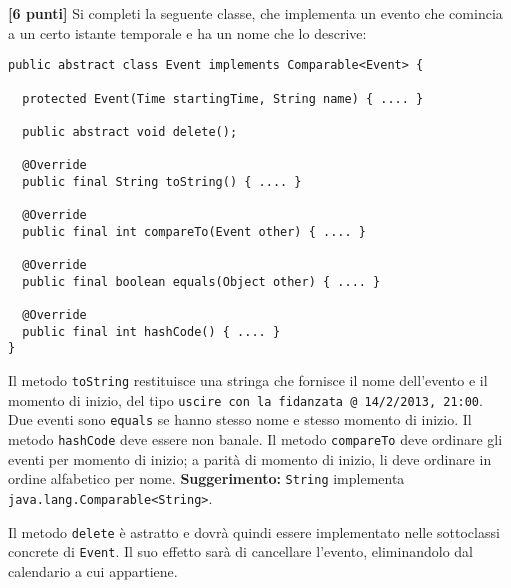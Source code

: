 \documentclass{article}[10pt]
\newcounter{esnu}
\newenvironment{esercizio}{\medskip \noindent {\bf Esercizio\addtocounter{esnu}{1} \arabic{esnu}}}{}
\begin{document}
\begin{esercizio}
\textbf{[6 punti]}
Si completi la seguente classe, che implementa un evento che comincia
a un certo istante temporale e ha un nome che lo descrive:
%
{\small
\begin{verbatim}
public abstract class Event implements Comparable<Event> {

  protected Event(Time startingTime, String name) { .... }

  public abstract void delete();

  @Override
  public final String toString() { .... }

  @Override
  public final int compareTo(Event other) { .... }

  @Override
  public final boolean equals(Object other) { .... }

  @Override
  public final int hashCode() { .... }
}
\end{verbatim}}

\noindent
Il metodo \texttt{toString} restituisce una stringa che fornisce il
nome dell'evento e il momento di inizio, del tipo
\texttt{uscire con la fidanzata @ 14/2/2013, 21:00}.
Due eventi sono \texttt{equals} se hanno stesso nome e stesso
momento di inizio. Il metodo \texttt{hashCode} deve
essere non banale. Il metodo \texttt{compareTo} deve ordinare
gli eventi per momento di inizio; a parit\`a di momento
di inizio, li deve ordinare in ordine alfabetico per nome.
\textbf{Suggerimento: } \texttt{String} implementa
\texttt{java.lang.Comparable<String>}.

Il metodo \texttt{delete} \`e astratto e dovr\`a quindi essere
implementato nelle sottoclassi concrete di \texttt{Event}.
Il suo effetto sar\`a di cancellare l'evento, eliminandolo
dal calendario a cui appartiene.
\end{esercizio}
\end{document}
